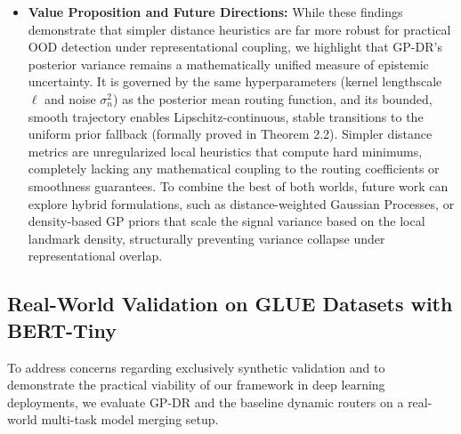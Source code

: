 \begin{itemize}
    In contrast, Gaussian Process posterior variance $\sigma^2(\psi_*) = \sigma_f^2 - \mathbf{k}_* \mathbf{M} \mathbf{k}_*^T$ is highly sensitive to localized proximity. Because the $N=64$ calibration landmarks are densely populated on the compact $K$-dimensional sphere, any point on the sphere or slightly inside it is geometrically close to at least one calibration landmark. Proximity to even a \emph{single} landmark causes the corresponding entry in $\mathbf{k}_*$ to surge to near-maximum. Under the positive-definite matrix inversion, this single high similarity is sufficient to drop the posterior variance to near-zero, completely overriding the global neighborhood density. This spatial sensitivity causes GPR posterior variance to collapse locally, making it highly vulnerable to OOD samples that reside near any calibration landmark, even if they share zero resemblance with the rest of the landmark density.
    
    \item \textbf{Value Proposition and Future Directions:} While these findings demonstrate that simpler distance heuristics are far more robust for practical OOD detection under representational coupling, we highlight that GP-DR's posterior variance remains a mathematically unified measure of epistemic uncertainty. It is governed by the same hyperparameters (kernel lengthscale $\ell$ and noise $\sigma_n^2$) as the posterior mean routing function, and its bounded, smooth trajectory enables Lipschitz-continuous, stable transitions to the uniform prior fallback (formally proved in Theorem 2.2). Simpler distance metrics are unregularized local heuristics that compute hard minimums, completely lacking any mathematical coupling to the routing coefficients or smoothness guarantees. To combine the best of both worlds, future work can explore hybrid formulations, such as distance-weighted Gaussian Processes, or density-based GP priors that scale the signal variance based on the local landmark density, structurally preventing variance collapse under representational overlap.
\end{itemize}

\subsection{Real-World Validation on GLUE Datasets with BERT-Tiny}
\label{sec:real_world_glue}
To address concerns regarding exclusively synthetic validation and to demonstrate the practical viability of our framework in deep learning deployments, we evaluate GP-DR and the baseline dynamic routers on a real-world multi-task model merging setup.


